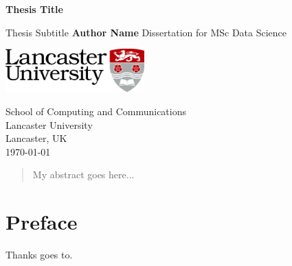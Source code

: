 \begin{titlepage}
\begin{center}
\vspace*{5cm}
\Huge{\textbf{Thesis Title}}

\vspace*{3cm}
\Large{Thesis Subtitle}
\vfill
\Large{\textbf{Author Name}}
\vfill
Dissertation for MSc Data Science

\vspace{0.8cm}
\includegraphics[width=0.4\textwidth]{img/lu-logo-cmyk.jpg}

School of Computing and Communications\\
Lancaster University\\
Lancaster, UK\\
\today
\end{center}
\end{titlepage}


\thispagestyle{empty}


\begin{abstract}
My abstract goes here...
\end{abstract}

\newpage

\chapter*{Preface}

Thanks goes to.

\setcounter{page}{1}
